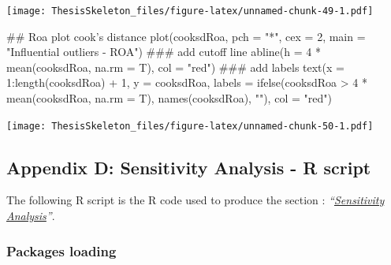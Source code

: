 \documentclass[12pt,]{article}
\newenvironment{Shaded}{}{}
\newcommand{\KeywordTok}[1]{\textcolor[rgb]{0.00,0.00,1.00}{#1}}
\newcommand{\DataTypeTok}[1]{#1}
\newcommand{\DecValTok}[1]{#1}
\newcommand{\StringTok}[1]{\textcolor[rgb]{0.00,0.50,0.50}{#1}}
\newcommand{\OperatorTok}[1]{#1}
\newcommand{\NormalTok}[1]{#1}
\begin{document}
\texttt{[image: ThesisSkeleton\_files/figure-latex/unnamed-chunk-49-1.pdf]}

\newpage

\begin{Shaded}
\begin{Highlighting}[]
\NormalTok{## Roa plot cook's distance}
\KeywordTok{plot}\NormalTok{(cooksdRoa, }\DataTypeTok{pch =} \StringTok{"*"}\NormalTok{, }\DataTypeTok{cex =} \DecValTok{2}\NormalTok{, }\DataTypeTok{main =} \StringTok{"Influential outliers - ROA"}\NormalTok{)}
\NormalTok{### add cutoff line}
\KeywordTok{abline}\NormalTok{(}\DataTypeTok{h =} \DecValTok{4} \OperatorTok{*}\StringTok{ }\KeywordTok{mean}\NormalTok{(cooksdRoa, }\DataTypeTok{na.rm =}\NormalTok{ T), }\DataTypeTok{col =} \StringTok{"red"}\NormalTok{)}
\NormalTok{### add labels}
\KeywordTok{text}\NormalTok{(}\DataTypeTok{x =} \DecValTok{1}\OperatorTok{:}\KeywordTok{length}\NormalTok{(cooksdRoa) }\OperatorTok{+}\StringTok{ }\DecValTok{1}\NormalTok{, }\DataTypeTok{y =}\NormalTok{ cooksdRoa, }\DataTypeTok{labels =} \KeywordTok{ifelse}\NormalTok{(cooksdRoa }\OperatorTok{>}\StringTok{ }
\StringTok{    }\DecValTok{4} \OperatorTok{*}\StringTok{ }\KeywordTok{mean}\NormalTok{(cooksdRoa, }\DataTypeTok{na.rm =}\NormalTok{ T), }\KeywordTok{names}\NormalTok{(cooksdRoa), }\StringTok{""}\NormalTok{), }
    \DataTypeTok{col =} \StringTok{"red"}\NormalTok{)}
\end{Highlighting}
\end{Shaded}

\texttt{[image: ThesisSkeleton\_files/figure-latex/unnamed-chunk-50-1.pdf]}

\newpage

\hypertarget{appendix-d-sensitivity-analysis---r-script}{\subsection*{Appendix
D: Sensitivity Analysis - R
script}\label{appendix-d-sensitivity-analysis---r-script}}

The following R script is the R code used to produce the section :
\emph{``\protect\hyperlink{sensitivity-analysis}{Sensitivity
Analysis}''}.

\subsubsection*{Packages loading}\label{packages-loading-1}
\end{document}
